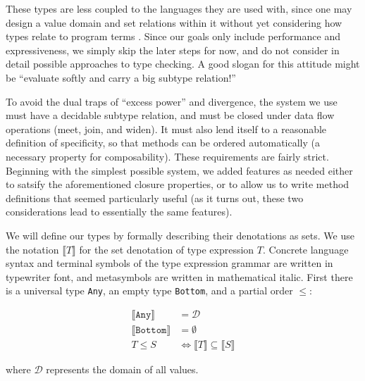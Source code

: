 These types
are less coupled to the languages they are used with, since one may design
a value domain and set relations within it without yet considering how types
relate to program terms \cite{1029823} \cite{Castagna:2005:GIS:1069774.1069793}.
Since our goals only include
performance and expressiveness, we simply skip the later steps for now, and do
not consider in detail possible approaches to type checking.
A good slogan for this attitude might be ``evaluate softly and carry a big
subtype relation!''

To avoid the dual traps of ``excess power'' and divergence, the system we use
must have a decidable subtype relation, and must be closed under data flow operations
(meet, join, and widen). It must also lend itself to a reasonable definition of
specificity, so that methods can be ordered automatically (a necessary property for
composability). These requirements are fairly strict.
Beginning with the simplest possible system, we added features as
needed either to satsify the aforementioned closure properties, or to allow us to
write method definitions that seemed particularly useful (as it turns out, these
two considerations lead to essentially the same features).

We will define our types by formally describing their denotations as sets.
We use the notation $\llbracket T \rrbracket$ for the set denotation of
type expression $T$.
Concrete language syntax and terminal symbols of the type expression grammar
are written in typewriter font, and metasymbols are written in mathematical italic.
First there is a universal type \texttt{Any}, an empty type \texttt{Bottom}, and
a partial order $\leq$:

\vspace{-3ex}
\begin{align*}
  \llbracket \texttt{Any} \rrbracket &= \mathcal{D} \\
  \llbracket \texttt{Bottom} \rrbracket &= \emptyset \\
  T \leq S &\Leftrightarrow \llbracket T \rrbracket \subseteq \llbracket S \rrbracket
\end{align*}

\noindent
where $\mathcal{D}$ represents the domain of all values.

